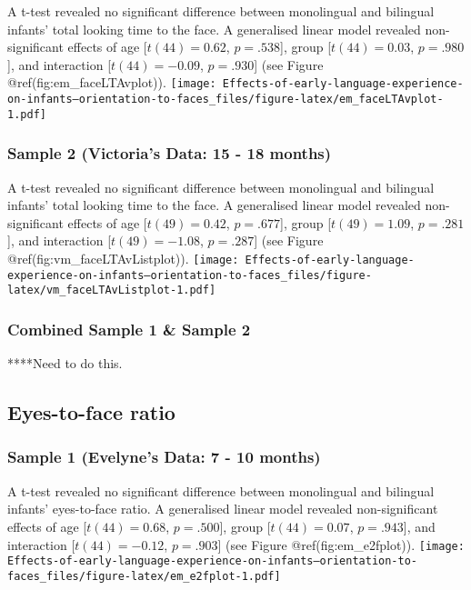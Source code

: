 \documentclass[english,man,floatsintext]{apa6}
\begin{document}
A t-test revealed no significant difference between monolingual and bilingual infants' total looking time to the face. A generalised linear model revealed non-significant effects of age {[}\(t(44) = 0.62\), \(p = .538\){]}, group {[}\(t(44) = 0.03\), \(p = .980\){]}, and interaction {[}\(t(44) = -0.09\), \(p = .930\){]} (see Figure @ref(fig:em\_faceLTAvplot)).
\texttt{[image: Effects-of-early-language-experience-on-infants--orientation-to-faces\_files/figure-latex/em\_faceLTAvplot-1.pdf]}

\hypertarget{sample-2-victorias-data-15---18-months-2}{%
\subsubsection{Sample 2 (Victoria's Data: 15 - 18 months)}\label{sample-2-victorias-data-15---18-months-2}}

A t-test revealed no significant difference between monolingual and bilingual infants' total looking time to the face. A generalised linear model revealed non-significant effects of age {[}\(t(49) = 0.42\), \(p = .677\){]}, group {[}\(t(49) = 1.09\), \(p = .281\){]}, and interaction {[}\(t(49) = -1.08\), \(p = .287\){]} (see Figure @ref(fig:vm\_faceLTAvListplot)).
\texttt{[image: Effects-of-early-language-experience-on-infants--orientation-to-faces\_files/figure-latex/vm\_faceLTAvListplot-1.pdf]}

\hypertarget{combined-sample-1-sample-2-2}{%
\subsubsection{Combined Sample 1 \& Sample 2}\label{combined-sample-1-sample-2-2}}

****Need to do this.

\hypertarget{eyes-to-face-ratio}{%
\subsection{Eyes-to-face ratio}\label{eyes-to-face-ratio}}

\hypertarget{sample-1-evelynes-data-7---10-months-3}{%
\subsubsection{Sample 1 (Evelyne's Data: 7 - 10 months)}\label{sample-1-evelynes-data-7---10-months-3}}

A t-test revealed no significant difference between monolingual and bilingual infants' eyes-to-face ratio. A generalised linear model revealed non-significant effects of age {[}\(t(44) = 0.68\), \(p = .500\){]}, group {[}\(t(44) = 0.07\), \(p = .943\){]}, and interaction {[}\(t(44) = -0.12\), \(p = .903\){]} (see Figure @ref(fig:em\_e2fplot)).
\texttt{[image: Effects-of-early-language-experience-on-infants--orientation-to-faces\_files/figure-latex/em\_e2fplot-1.pdf]}
\end{document}
